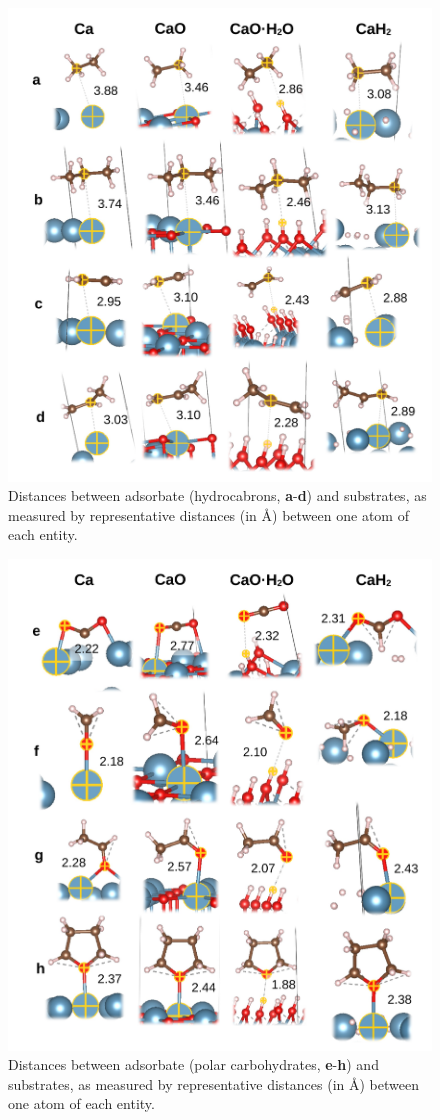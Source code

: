 \documentclass[12pt,a4paper]{article}
\begin{document}
\begin{figure}[!h]
	\centering
	\includegraphics[width=.7\linewidth]{Figure7}
	\caption{Distances between adsorbate (hydrocabrons, \textbf{a}-\textbf{d}) and substrates, as measured by representative distances (in \si{\angstrom}) between one atom of each entity.}
	\label{fig:distsad}
\end{figure}

\begin{figure}[!h]
\centering
\includegraphics[width=.7\linewidth]{Figure8}
\caption{Distances between adsorbate (polar carbohydrates, \textbf{e}-\textbf{h}) and substrates, as measured by representative distances (in \si{\angstrom}) between one atom of each entity.}
\label{fig:distseh}
\end{figure}
\end{document}
